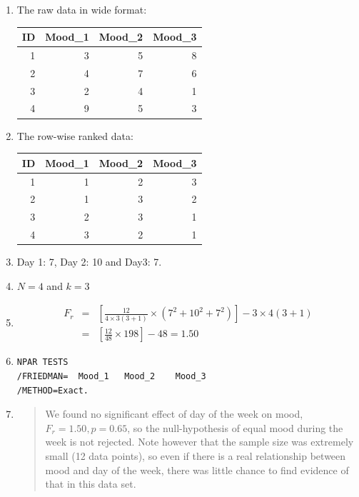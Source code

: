 \documentclass[]{book}\usepackage[]{graphicx}\usepackage[]{color}
\newenvironment{knitrout}{}{} %
\begin{document}
\begin{enumerate}

\item
The raw data in wide format:
\begin{knitrout}
\color{fgcolor}
\begin{tabular}{r|r|r|r}
\hline
ID & Mood\_1 & Mood\_2 & Mood\_3\\
\hline
1 & 3 & 5 & 8\\
\hline
2 & 4 & 7 & 6\\
\hline
3 & 2 & 4 & 1\\
\hline
4 & 9 & 5 & 3\\
\hline
\end{tabular}


\end{knitrout}

\item
The row-wise ranked data:
\begin{knitrout}
\color{fgcolor}
\begin{tabular}{r|r|r|r}
\hline
ID & Mood\_1 & Mood\_2 & Mood\_3\\
\hline
1 & 1 & 2 & 3\\
\hline
2 & 1 & 3 & 2\\
\hline
3 & 2 & 3 & 1\\
\hline
4 & 3 & 2 & 1\\
\hline
\end{tabular}


\end{knitrout}
\item Day 1: 7, Day 2: 10 and Day3: 7.
\item $N=4$ and $k=3$
\item

\begin{eqnarray}
F_r &=& \left[  \frac{12}{4 \times  3(3+1)} \times (7^2 + 10^2 + 7^2)      \right] - 3 \times 4 (3+1) \nonumber \\
  &=&   \left[  \frac{12}{48} \times  198      \right] - 48 = 1.50  \nonumber
\end{eqnarray}

\item

\begin{verbatim}
NPAR TESTS
/FRIEDMAN=  Mood_1   Mood_2    Mood_3
/METHOD=Exact.
\end{verbatim}

\item
\begin{quotation}
We found no significant effect of day of the week on mood, $F_r=1.50, p=0.65$, so the null-hypothesis of equal mood during the week is not rejected. Note however that the sample size was extremely small (12 data points), so even if there is a real relationship between mood and day of the week, there was little chance to find evidence of that in this data set.
\end{quotation}


\end{enumerate}
\end{document}
